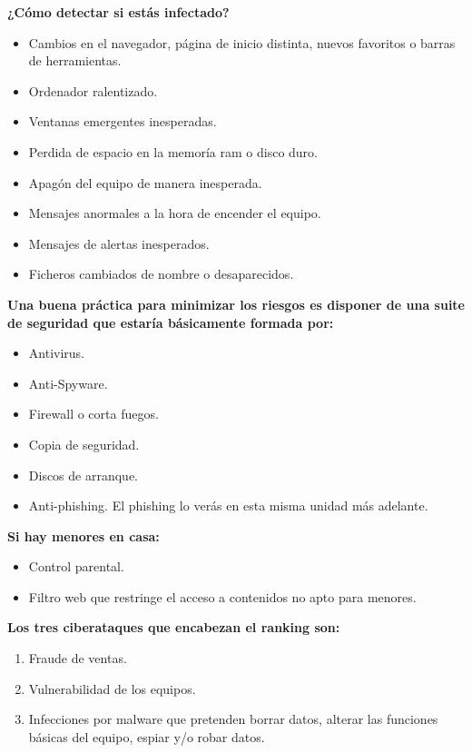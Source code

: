 \documentclass[
  spanish,
  a4paper,
  openany]{book}
\begin{document}
\textbf{¿Cómo detectar si estás infectado?}

\begin{itemize}
\item
  Cambios en el navegador, página de inicio distinta, nuevos favoritos o barras de herramientas.
\item
  Ordenador ralentizado.
\item
  Ventanas emergentes inesperadas.
\item
  Perdida de espacio en la memoría ram o disco duro.
\item
  Apagón del equipo de manera inesperada.
\item
  Mensajes anormales a la hora de encender el equipo.
\item
  Mensajes de alertas inesperados.
\item
  Ficheros cambiados de nombre o desaparecidos.
\end{itemize}

\textbf{Una buena práctica para minimizar los riesgos es disponer de una suite de seguridad que estaría básicamente formada por:}

\begin{itemize}
\item
  Antivirus.
\item
  Anti-Spyware.
\item
  Firewall o corta fuegos.
\item
  Copia de seguridad.
\item
  Discos de arranque.
\item
  Anti-phishing. El phishing lo verás en esta misma unidad más adelante.
\end{itemize}

\textbf{Si hay menores en casa:}

\begin{itemize}
\item
  Control parental.
\item
  Filtro web que restringe el acceso a contenidos no apto para menores.
\end{itemize}

\textbf{Los tres ciberataques que encabezan el ranking son:}

\begin{enumerate}
\def\labelenumi{\arabic{enumi}.}
\item
  Fraude de ventas.
\item
  Vulnerabilidad de los equipos.
\item
  Infecciones por malware que pretenden borrar datos, alterar las funciones básicas del equipo, espiar y/o robar datos.
\end{enumerate}
\end{document}
